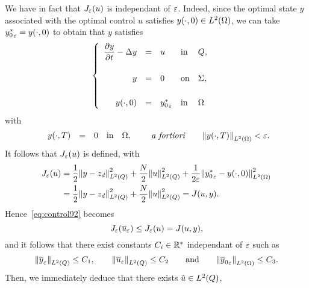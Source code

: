 We have in fact that $J_{\varepsilon}(u)$ is independant of $\varepsilon$. Indeed,
since the optimal state $y$ associated with the optimal control $u$
satisfies ${y}\!\left({\cdot, 0}\right)\in L^{2}\!\left({\Omega}\right)$, we can take
${y_{0}^{*}}_{\varepsilon} = {y}\!\left({\cdot, 0}\right)$ to obtain that $y$ satisfies
\begin{equation*}
    \begin{cases}\displaystyle
        \begin{array}{rclll}
            \dfrac{\partial{}y}{\partial{}t} - \Delta y & = & u & \text{in} & Q,\\
            \\
            y & = & 0 & \text{on} & \Sigma,\\
            \\
            {y}\!\left({\cdot, 0}\right) & = & {y_{0}^{*}}_{\varepsilon} & \text{in} &
            \Omega
        \end{array}
    \end{cases}
\end{equation*}
with
\begin{equation*}
    \begin{array}{rclll}
        {y}\!\left({\cdot,T}\right) & = & 0 & \text{in} & \Omega,
    \end{array}
    \qquad\text{\textit{a fortiori}}\qquad {\left\|{ {y}\!\left({\cdot,T}\right)  }\right\|}_{L^{2}\left({\Omega}\right)} <
    \varepsilon.
\end{equation*}
It follows that $J_{\varepsilon}(u)$ is defined, with
\begin{equation*}
    \begin{split}
        J_{\veps}(u) &= \dfrac{1}{2}\normecq{y - z_{d}} +
        \dfrac{N}{2}\normecq{u} + \dfrac{1}{2\veps}\normecohm{%
            {y_{0}^{*}}_{\veps} - \condinitiale{y}
        }\\
        & = \dfrac{1}{2}\normecq{y - z_{d}} + \dfrac{N}{2}\normecq{u} =
        J(u,y).
    \end{split}
\end{equation*}
Hence~\eqref{eq:control92} becomes
\begin{equation}\label{eq:control95}
    J_{\varepsilon}\!\left({{\overline{u}}_{\varepsilon}}\right) \leq J_{\varepsilon}(u) = J(u,y),
\end{equation}
and it follows that there exist constants $C_{i}\in{\mathbb{R}}^{*}$ independant
of $\varepsilon$ such as
\begin{equation*}
    {\left\|{ {\overline{y}}_{\varepsilon}  }\right\|}_{L^{2}\left({Q}\right)} \leq C_{1},\qquad
    {\left\|{ {\overline{u}}_{\varepsilon}  }\right\|}_{L^{2}\left({Q}\right)}\leq C_{2}\qquad\text{and}\qquad
    {\left\|{{\overline{y}_{0}}_{\varepsilon} }\right\|}_{L^{2}\left({\Omega}\right)}\leq C_{3}.
\end{equation*}
Then, we immediately deduce that there exists $\hat{u}\in L^{2}\!\left({Q}\right)$,
